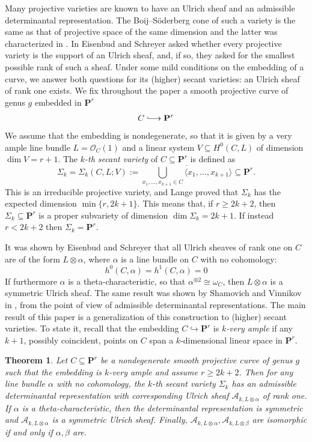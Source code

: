 \documentclass[12pt]{amsart}
\newtheorem{introthm}{Theorem}
\numberwithin{equation}{section}
\numberwithin{thmcounter}{section}
\theoremstyle{definition}
\theoremstyle{claim}
\newcommand{\nP}{\mathbf{P}}
\newcommand{\sA}{\mathscr{A}}
\newcommand{\sO}{\mathscr{O}}
\newcommand*{\longhookrightarrow}{\ensuremath{\lhook\joinrel\relbar\joinrel\rightarrow}}
\begin{document}
Many projective varieties are known to have  an Ulrich sheaf and an admissible determinantal representation. The Boij--S\"oderberg cone of such a variety is the same as that of projective space of the same dimension and the latter was characterized in \cite{eisenbudschreyer2}.
In \cite[page 543]{eisenbudschreyer} Eisenbud and Schreyer asked whether every projective variety is the support of an Ulrich sheaf, and, if so, they asked for the smallest possible rank of such a sheaf. Under some mild conditions on the embedding of a curve, we answer both questions for its (higher) secant varieties: an Ulrich sheaf of rank one exists.
We fix throughout the paper  a smooth projective curve of genus $g$ embedded in $\nP^r$
\[C \longhookrightarrow \nP^r\]
We assume that the embedding is nondegenerate, so that it is given by a very ample line bundle $L=\sO_C(1)$ and a linear system $V\subseteq H^0(C,L)$ of dimension $\dim V=r+1$. The  \emph{$k$-th secant variety} of $C \subseteq \nP^r$ is defined as
$$
\Sigma_k=\Sigma_k(C,L;V):=\overline{\bigcup_{x_1, \ldots, x_{k+1} \in C} \langle x_1, \ldots, x_{k+1} \rangle} \subseteq \nP^r.
$$
This is an irreducible projective variety, and
Lange \cite{lange} proved that $\Sigma_k$ has the expected dimension $\min\{r, 2k+1\}$. This means that, if $r \geq 2k+2$, then $\Sigma_{k}\subseteq  \nP^r$ is a proper subvariety of dimension $\dim \Sigma_k = 2k+1$. If instead $r<2k+2$ then $\Sigma_k = \mathbf{P}^r$.

\medskip

It was shown by Eisenbud and Schreyer \cite[Theorem 4.3]{eisenbudschreyer} that all Ulrich sheaves of rank one on $C$ are of the form $L\otimes \alpha$, where $\alpha$ is a line bundle on $C$ with no cohomology:
\[  h^0(C,\alpha) = h^1(C,\alpha) = 0 \]
If furthermore $\alpha$ is a theta-characteristic, so that $\alpha^{\otimes 2} \cong \omega_C$, then $L\otimes \alpha$
is a symmetric Ulrich sheaf. The same result was shown by Shamovich and Vinnikov in \cite{shamovichvinnikov}, from the point of view of admissible determinantal representations. The main result of this paper is a generalization of this construction to (higher) secant varieties. To state it, recall that the embedding $C\hookrightarrow \nP^r$ is \emph{$k$-very ample} if any $k+1$, possibly coincident, points on $C$ span a $k$-dimensional linear space in $\nP^r$.

\begin{introthm}\label{thm:main}
	Let $C \subseteq \nP^r$ be a nondegenerate smooth projective curve of genus $g$ such that the embedding is $k$-very ample and assume $r\geq 2k+2$. Then for any line bundle $\alpha$ with no cohomology, the $k$-th secant variety $\Sigma_k$ has an admissible determinantal representation with corresponding Ulrich sheaf $\sA_{k,L\otimes \alpha}$ of rank one. If $\alpha$ is a theta-characteristic, then the determinantal representation is symmetric and $\sA_{k,L\otimes \alpha}$ is a symmetric Ulrich sheaf. Finally, $\sA_{k,L\otimes\alpha}, \sA_{k,L\otimes\beta}$ are isomorphic if and only if $\alpha, \beta$ are.
\end{introthm}
\end{document}
